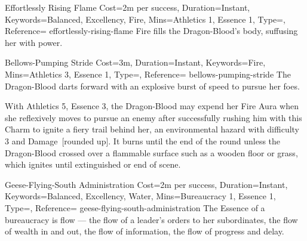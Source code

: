 

\begin{Charm}{Effortlessly Rising Flame}{%
    Cost=2m per success,
    Duration=Instant,
    Keywords={Balanced, Excellency, Fire},
    Mins={Athletics 1, Essence 1},
    Type=\SupplementalType,
    Reference=\cite*[p.~168]{db}
}{effortlessly-rising-flame}
    Fire fills the Dragon-Blood's body, suffusing her with power. 
\end{Charm}


\begin{Charm}{Bellows-Pumping Stride}{%
    Cost=3m,
    Duration=Instant,
    Keywords=Fire,
    Mins={Athletics 3, Essence 1},
    Type=\SupplementalType,
    Reference=\cite*[p.~168]{db}
}{bellows-pumping-stride}
    The Dragon-Blood darts forward with an explosive burst of speed to pursue her
    foes. 

    \begin{Unavailable}
        With Athletics 5, Essence 3, the Dragon-Blood may expend her Fire Aura when
        she reflexively moves to pursue an enemy after successfully rushing him with
        this Charm to ignite a fiery trail behind her, an environmental hazard with
        difficulty 3 and Damage~[rounded up]. It burns
        until the end of the round unless the Dragon-Blood crossed over a flammable
        surface such as a wooden floor or grass, which ignites until extinguished or
        end of scene.
    \end{Unavailable}
\end{Charm}



\DocumentColumnBreak
{}

\begin{Charm}{Geese-Flying-South Administration}{%
    Cost=2m per success,
    Duration=Instant,
    Keywords={Balanced, Excellency, Water},
    Mins={Bureaucracy 1, Essence 1},
    Type=\SupplementalType,
    Reference=\cite*[p.~181]{db}
}{geese-flying-south-administration}
    The Essence of a bureaucracy is flow --- the flow of a leader's orders to her
    subordinates, the flow of wealth in and out, the flow of information, the flow
    of progress and delay. 
\end{Charm}


